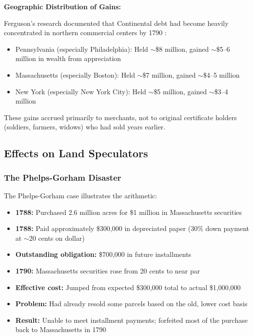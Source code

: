 \documentclass[12pt]{article}
\begin{document}
\textbf{Geographic Distribution of Gains:}

Ferguson's research documented that Continental debt had become heavily concentrated in northern commercial centers by 1790 \citep{Ferguson1961}:

\begin{itemize}
\item Pennsylvania (especially Philadelphia): Held $\sim$\$8 million, gained $\sim$\$5--6 million in wealth from appreciation
\item Massachusetts (especially Boston): Held $\sim$\$7 million, gained $\sim$\$4--5 million
\item New York (especially New York City): Held $\sim$\$5 million, gained $\sim$\$3--4 million
\end{itemize}

These gains accrued primarily to merchants, not to original certificate holders (soldiers, farmers, widows) who had sold years earlier.

\subsection{Effects on Land Speculators}

\subsubsection{The Phelps-Gorham Disaster}

The Phelps-Gorham case illustrates the arithmetic:

\begin{itemize}
\item \textbf{1788:} Purchased 2.6 million acres for \$1 million in Massachusetts securities
\item \textbf{1788:} Paid approximately \$300,000 in depreciated paper (30\% down payment at $\sim$20 cents on dollar)
\item \textbf{Outstanding obligation:} \$700,000 in future installments
\item \textbf{1790:} Massachusetts securities rose from 20 cents to near par
\item \textbf{Effective cost:} Jumped from expected \$300,000 total to actual \$1,000,000
\item \textbf{Problem:} Had already resold some parcels based on the old, lower cost basis
\item \textbf{Result:} Unable to meet installment payments; forfeited most of the purchase back to Massachusetts in 1790
\end{itemize}
\end{document}

